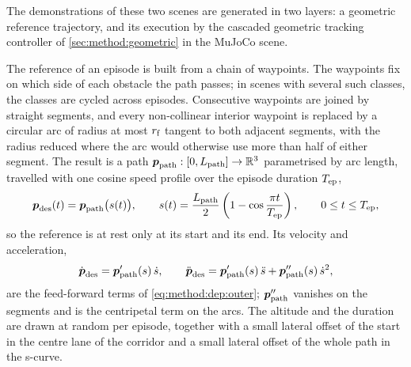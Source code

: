The demonstrations of these two scenes are generated in two layers: a geometric reference trajectory,
and its execution by the cascaded geometric tracking controller of \autoref{sec:method:geometric} in the
MuJoCo scene.

The reference of an episode is built from a chain of waypoints. The waypoints fix on which side of each
obstacle the path passes; in scenes with several such classes, the classes are cycled across episodes.
Consecutive waypoints are joined by straight segments, and every non-collinear interior waypoint is
replaced by a circular arc of radius at most $r_{\textrm{f}}$ tangent to both adjacent segments, with the
radius reduced where the arc would otherwise use more than half of either segment. The result is a
path $\boldsymbol{p}_{\textrm{path}}:[0,L_{\textrm{path}}]\to\mathbb{R}^{3}$ parametrised by arc length, travelled with one cosine
speed profile over the episode duration $T_{\textrm{ep}}$,
\begin{equation}\label{eq:method:env:uavref}
  \boldsymbol{p}_{\textrm{des}}(t) = \boldsymbol{p}_{\textrm{path}}\big(s(t)\big),
  \qquad
  s(t) = \frac{L_{\textrm{path}}}{2}\left(1-\cos\frac{\pi t}{T_{\textrm{ep}}}\right),
  \qquad 0\le t\le T_{\textrm{ep}},
\end{equation}
so the reference is at rest only at its start and its end. Its velocity and acceleration,
\begin{equation}\label{eq:method:env:uavrefderiv}
  \dot{\boldsymbol{p}}_{\textrm{des}} = \boldsymbol{p}_{\textrm{path}}'(s)\,\dot{s},
  \qquad
  \ddot{\boldsymbol{p}}_{\textrm{des}} = \boldsymbol{p}_{\textrm{path}}'(s)\,\ddot{s} + \boldsymbol{p}_{\textrm{path}}''(s)\,\dot{s}^{2},
\end{equation}
are the feed-forward terms of \eqref{eq:method:dep:outer}; $\boldsymbol{p}_{\textrm{path}}''$ vanishes on the segments
and is the centripetal term on the arcs. The altitude and the duration are drawn at random per
episode, together with a small lateral offset of the start in the centre lane of the corridor and a
small lateral offset of the whole path in the s-curve.

